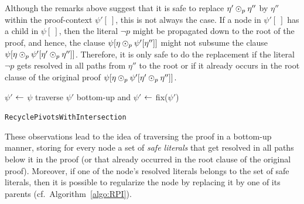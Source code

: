 \documentclass[envcountsame]{llncs}
\newcommand{\RPIlong}{\texttt{Recycle\-Pivots\-With\-Intersection}}
\begin{document}
Although the remarks above suggest that it is safe to replace $\eta' \odot_p
\eta''$ by $\eta''$ within the proof-context $\psi'[\ ]$, this is not always the
case. If a node in $\psi'[\ ]$ has a child in $\psi[\ ]$, then the literal $\neg
p$ might be propagated down to the root of the proof, and hence, the clause
$\psi[ \eta \odot_p \psi'[ \eta''] ]$ might not subsume the clause $\psi[ \eta
\odot_p \psi'[\eta' \odot_p \eta''] ]$. Therefore, it is only safe to do the
replacement if the literal $\neg p$ gets resolved in all paths from $\eta''$ to the root or if it already occurs in the root clause of the original proof $\psi[ \eta \odot_p \psi'[\eta' \odot_p \eta''] ]$.

\linesnumbered
\begin{algorithm}[!b]
\begin{footnotesize}
\SetLine
{}


\BlankLine

$\psi'$ $\leftarrow$ $\psi$\;
traverse $\psi'$ bottom-up and 
$\psi'$ $\leftarrow$ fix($\psi'$) \;
\;
\caption{\label{algo:RPI} \texttt{\RPIlong}}
\end{footnotesize}
\end{algorithm}


These observations lead to the idea of traversing the proof in a bottom-up
manner, storing for every node a set of \emph{safe literals} that get resolved
in all paths below it in the proof (or that already occurred in the root clause
of the original proof). Moreover, if one of the node's resolved literals belongs
to the set of safe literals, then it is possible to regularize the node by
replacing it by one of its parents (cf.\ Algorithm~\ref{algo:RPI}). 
\end{document}

